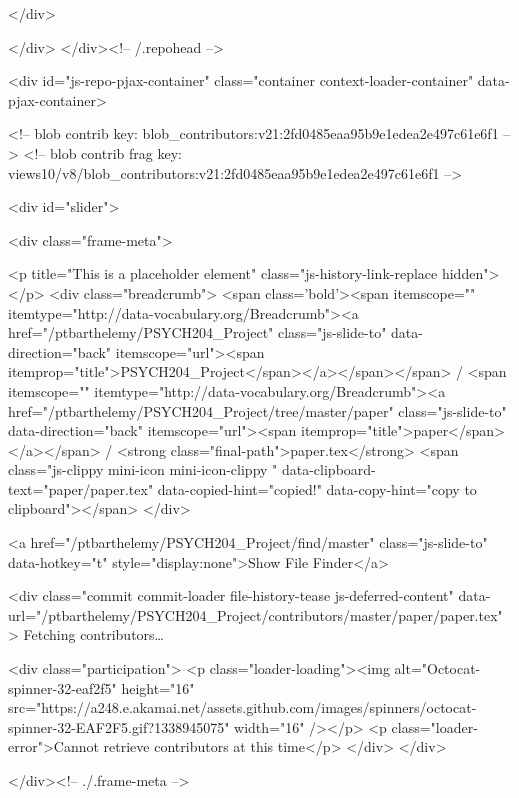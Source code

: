 </div>

  
  
  


            
          </div>
        </div><!-- /.repohead -->

        <div id="js-repo-pjax-container" class="container context-loader-container" data-pjax-container>
          


<!-- blob contrib key: blob_contributors:v21:2fd0485eaa95b9e1edea2e497c61e6f1 -->
<!-- blob contrib frag key: views10/v8/blob_contributors:v21:2fd0485eaa95b9e1edea2e497c61e6f1 -->

<div id="slider">


    <div class="frame-meta">

      <p title="This is a placeholder element" class="js-history-link-replace hidden"></p>
      <div class="breadcrumb">
        <span class='bold'><span itemscope="" itemtype="http://data-vocabulary.org/Breadcrumb"><a href="/ptbarthelemy/PSYCH204_Project" class="js-slide-to" data-direction="back" itemscope="url"><span itemprop="title">PSYCH204_Project</span></a></span></span> / <span itemscope="" itemtype="http://data-vocabulary.org/Breadcrumb"><a href="/ptbarthelemy/PSYCH204_Project/tree/master/paper" class="js-slide-to" data-direction="back" itemscope="url"><span itemprop="title">paper</span></a></span> / <strong class="final-path">paper.tex</strong> <span class="js-clippy mini-icon mini-icon-clippy " data-clipboard-text="paper/paper.tex" data-copied-hint="copied!" data-copy-hint="copy to clipboard"></span>
      </div>

      <a href="/ptbarthelemy/PSYCH204_Project/find/master" class="js-slide-to" data-hotkey="t" style="display:none">Show File Finder</a>

        <div class="commit commit-loader file-history-tease js-deferred-content" data-url="/ptbarthelemy/PSYCH204_Project/contributors/master/paper/paper.tex">
          Fetching contributors…

          <div class="participation">
            <p class="loader-loading"><img alt="Octocat-spinner-32-eaf2f5" height="16" src="https://a248.e.akamai.net/assets.github.com/images/spinners/octocat-spinner-32-EAF2F5.gif?1338945075" width="16" /></p>
            <p class="loader-error">Cannot retrieve contributors at this time</p>
          </div>
        </div>

    </div><!-- ./.frame-meta -->

